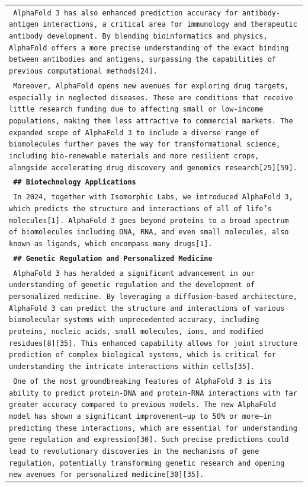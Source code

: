 \documentclass[11pt]{article}
\begin{document}
\begin{longtable}{p{\textwidth}}
\texttt{\small{ AlphaFold 3 has also enhanced prediction accuracy for antibody-antigen interactions, a critical area for immunology and therapeutic antibody development. By blending bioinformatics and physics, AlphaFold offers a more precise understanding of the exact binding between antibodies and antigens, surpassing the capabilities of previous computational methods[24]. }} \\
\texttt{\small{ Moreover, AlphaFold opens new avenues for exploring drug targets, especially in neglected diseases. These are conditions that receive little research funding due to affecting small or low-income populations, making them less attractive to commercial markets. The expanded scope of AlphaFold 3 to include a diverse range of biomolecules further paves the way for transformational science, including bio-renewable materials and more resilient crops, alongside accelerating drug discovery and genomics research[25][59]. }} \\
\vspace{1pt}
\texttt{\small{\textbf{ \#\# Biotechnology Applications }}} \\
\texttt{\small{ In 2024, together with Isomorphic Labs, we introduced AlphaFold 3, which predicts the structure and interactions of all of life’s molecules[1]. AlphaFold 3 goes beyond proteins to a broad spectrum of biomolecules including DNA, RNA, and even small molecules, also known as ligands, which encompass many drugs[1]. }} \\
\vspace{1pt}
\texttt{\small{\textbf{ \#\# Genetic Regulation and Personalized Medicine }}} \\
\texttt{\small{ AlphaFold 3 has heralded a significant advancement in our understanding of genetic regulation and the development of personalized medicine. By leveraging a diffusion-based architecture, AlphaFold 3 can predict the structure and interactions of various biomolecular systems with unprecedented accuracy, including proteins, nucleic acids, small molecules, ions, and modified residues[8][35]. This enhanced capability allows for joint structure prediction of complex biological systems, which is critical for understanding the intricate interactions within cells[35]. }} \\
\texttt{\small{ One of the most groundbreaking features of AlphaFold 3 is its ability to predict protein-DNA and protein-RNA interactions with far greater accuracy compared to previous models. The new AlphaFold model has shown a significant improvement—up to 50\% or more—in predicting these interactions, which are essential for understanding gene regulation and expression[30]. Such precise predictions could lead to revolutionary discoveries in the mechanisms of gene regulation, potentially transforming genetic research and opening new avenues for personalized medicine[30][35]. }} \\

\end{longtable}
\end{document}
